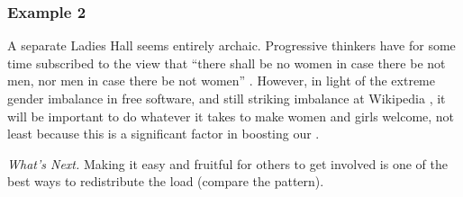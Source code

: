 \subsubsection*{Example 2}
A separate Ladies Hall seems entirely archaic.  Progressive thinkers have for
some time subscribed to the view that ``there shall be no women in
case there be not men, nor men in case there be not women''
\cite[Chapter 1.LII]{rabelais1894gargantua}.  However, in light of the
extreme gender imbalance in free software, and still striking
imbalance at Wikipedia \cite{gender,FM4291}, it will be important to
do whatever it takes to make women and girls welcome, not least
because this is a significant factor in boosting our
.


\begin{framed}
\noindent 
\emph{What's Next.}  Making it easy and fruitful for others to get involved is one of the best ways to redistribute the load (compare the
 pattern).
\end{framed}



  
